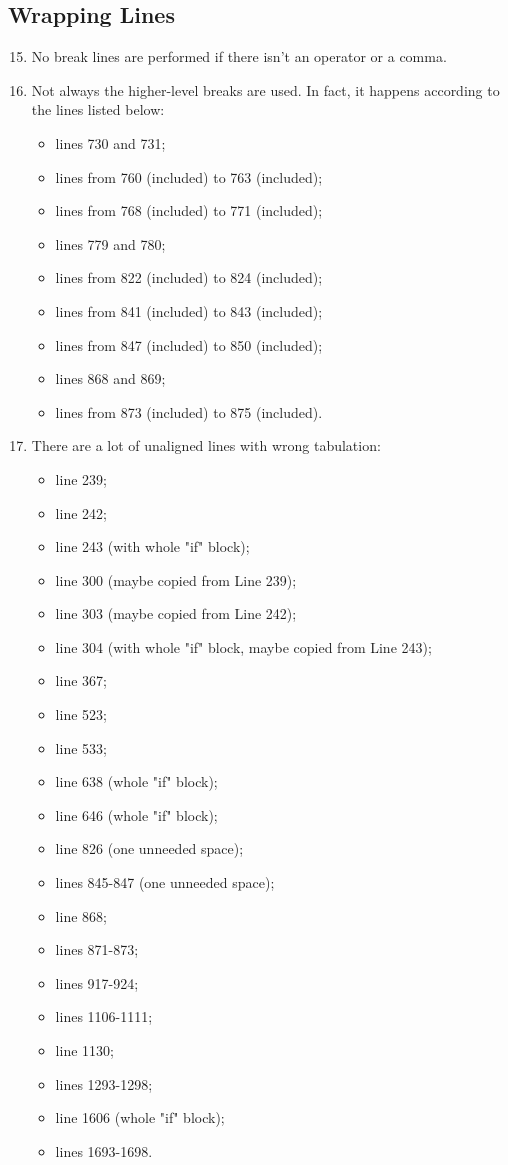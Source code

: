 \subsection{Wrapping Lines}
\begin{enumerate}
	\setcounter{enumi}{14}
	\item No break lines are performed if there isn't an operator or a comma.
	\item Not always the higher-level breaks are used. In fact, it happens according to the lines listed below:
	    \begin{itemize}
	        \item lines 730 and 731;
	        \item lines from 760 (included) to 763 (included);
	        \item lines from 768 (included) to 771 (included);
	        \item lines 779 and 780;
	        \item lines from 822 (included) to 824 (included);
	        \item lines from 841 (included) to 843 (included);
	        \item lines from 847 (included) to 850 (included);
	        \item lines 868 and 869;
	        \item lines from 873 (included) to 875 (included).
	    \end{itemize}
	\item There are a lot of unaligned lines with wrong tabulation:
	\begin{itemize}
		\item line 239;
		\item line 242;
		\item line 243 (with whole "if" block);
		\item line 300 (maybe copied from Line 239);
		\item line 303 (maybe copied from Line 242);
		\item line 304 (with whole "if" block, maybe copied from Line 243);
		\item line 367;
		\item line 523;
		\item line 533;
		\item line 638 (whole "if" block);
		\item line 646 (whole "if" block);
		\item line 826 (one unneeded space);
		\item lines 845-847 (one unneeded space);
		\item line 868;
		\item lines 871-873;
		\item lines 917-924;
		\item lines 1106-1111;
		\item line 1130;
		\item lines 1293-1298;
		\item line 1606 (whole "if" block);
		\item lines 1693-1698.
	\end{itemize}
\end{enumerate}
